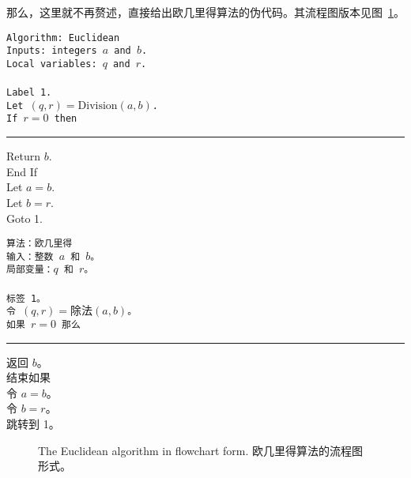 那么，这里就不再赘述，直接给出欧几里得算法的伪代码。其流程图版本见图~\ref{fig:Euc_alg}。

\medskip

\begin{center}
\begin{minipage}[b]{.7\textwidth}
\tt Algorithm: Euclidean\\
Inputs: integers $a$ and $b$.\\
Local variables: $q$ and $r$.\\
\\
Label 1.\\
Let $(q,r)  = \mbox{Division}(a,b)$. \\
If $r = 0$ then\\
\rule{15pt}{0pt} Return $b$.\\
End If\\
Let $a = b$.\\
Let $b = r$.\\
Goto 1. \\
\end{minipage}
\end{center}

\begin{center}
\begin{minipage}[b]{.7\textwidth}
\tt 算法：欧几里得\\
输入：整数 $a$ 和 $b$。\\
局部变量：$q$ 和 $r$。\\
\\
标签 1。\\
令 $(q,r) = \mbox{除法}(a,b)$。\\
如果 $r = 0$ 那么\\
\rule{15pt}{0pt} 返回 $b$。\\
结束如果\\
令 $a = b$。\\
令 $b = r$。\\
跳转到 1。\\
\end{minipage}
\end{center}

\begin{figure}[!hbt] 
\begin{center}

\end{center}

\caption{The Euclidean algorithm in flowchart form. 欧几里得算法的流程图形式。}
\label{fig:Euc_alg}
\end{figure}

